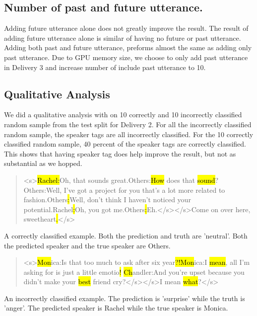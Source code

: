 \documentclass[11pt]{article}
\begin{document}
\subsection{Number of past and future utterance.}

Adding future utterance alone does not greatly improve the result. The result of adding future utterance alone is similar of having no future or past utterance. Adding both past and future utterance, preforms almost the same as adding only past utterance. Due to GPU memory size, we choose to only add past utterance in Delivery 3 and increase number of include past utterance to 10.

\subsection{Qualitative Analysis}

We did a qualitative analysis with on 10 correctly and 10 incorrectly classified random sample from the test split for Delivery 2. For all the incorrectly classified random sample, the speaker tags are all incorrectly classified. For the 10 correctly classified random sample, 40 percent of the speaker tags are correctly classified. This shows that having speaker tag does help improve the result, but not as substantial as we hopped. 

{\small

\begin{quote}
<s>\hl{Rachel}\hl{:}Oh, that sounds great.Others:\hl{How} does that \hl{sound}?Others:Well, I’ve got a project for you that’s a lot more related to fashion.Others\hl{:}Well, don’t think I haven’t noticed your potential.Rachel\hl{:}Oh, you got me.Others\hl{:}Eh.</s></s>Come on over here, sweetheart\hl{.}</s>

\end{quote}

A correctly classified example. Both the prediction and truth are 'neutral'. Both the predicted speaker and the true speaker are Others.

\begin{quote}

<s>\hl{Mon}ica:Is that too much to ask after six year\hl{?!}\hl{Mon}ica:I \hl{mean}, all I’m asking for is just a little emotio\hl{!} \hl{Ch}andler:And you’re upset because you didn’t make your \hl{best} friend cry?</s></s>I mean \hl{what}?</s>

\end{quote}

An incorrectly classified example. The prediction is 'surprise' while the truth is 'anger'. The predicted speaker is Rachel while the true speaker is Monica.}
\end{document}

